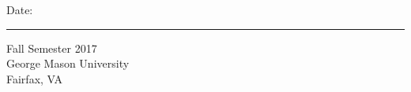         Date: \rule{\datelinelength}{\siglinedepth} \hspace{\spacesiglinename} \!\!Fall Semester 2017 \\
        George Mason University \\
        Fairfax, VA
\newpage

